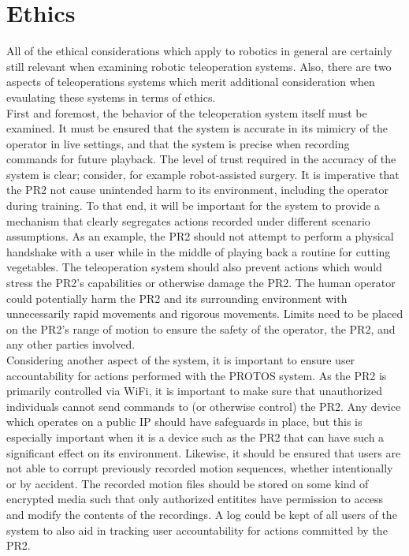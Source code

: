 \documentclass{sig-alternate}
\begin{document}
\section{Ethics}
\label{sec:ethics}All of the ethical considerations which apply to robotics in 
general are certainly still relevant when examining robotic teleoperation systems.
Also, there are two aspects of teleoperations systems which merit additional
consideration when evaulating these systems in terms of ethics. \\
\indent First and foremost, the behavior of the teleoperation system itself 
must be examined. It must be ensured that the system is accurate in its mimicry
of the operator in live settings, and that the system is precise when
recording commands for future playback. The level of trust required in the
accuracy of the system is clear; consider, for example robot-assisted surgery.
It is imperative that the PR2 not cause unintended harm to its environment, 
including the operator during training. To that end, it will be important
for the system to provide a mechanism that clearly segregates actions recorded 
under different scenario assumptions. As an example, the PR2 should not attempt to 
perform a physical handshake with a user while  in the middle of playing back a routine
for cutting vegetables. The teleoperation system should also
prevent actions which would stress the PR2's capabilities or otherwise
damage the PR2. The human operator could potentially harm the PR2 and its surrounding environment
with unnecessarily rapid movements and rigorous movements. Limits need to be placed on the PR2's
range of motion to ensure the safety of the operator, the PR2, and any other parties involved. \\
\indent Considering another aspect of the system, it is important to ensure
user accountability for actions performed with the PROTOS system. 
As the PR2 is primarily controlled via WiFi, it is important
to make sure that unauthorized individuals cannot send commands to (or 
otherwise control) the PR2. Any device which operates on a public IP should 
have safeguards in place, but this is especially important when it is a device such as
the PR2 that can have such a significant effect on its environment.
Likewise, it should be ensured that users are
not able to corrupt previously recorded motion sequences, whether 
intentionally or by accident. The recorded motion files should be stored on some kind of
encrypted media such that only authorized entitites have permission to access and modify the
contents of the recordings. A log could be kept of all users of the system to also aid in tracking user
accountability for actions committed by the PR2.
\end{document}
